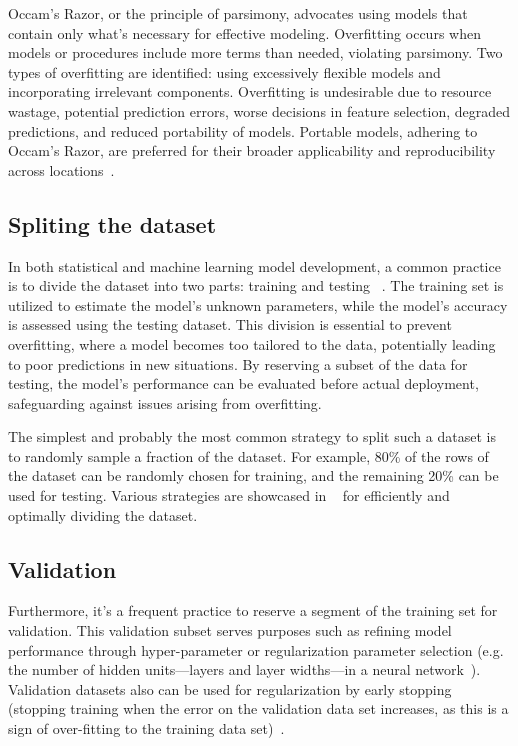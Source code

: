 Occam's Razor, or the principle of parsimony, advocates using models that contain only what's necessary for effective modeling. Overfitting occurs when models or procedures include more terms than needed, violating parsimony. Two types of overfitting are identified: using excessively flexible models and incorporating irrelevant components. Overfitting is undesirable due to resource wastage, potential prediction errors, worse decisions in feature selection, degraded predictions, and reduced portability of models. Portable models, adhering to Occam's Razor, are preferred for their broader applicability and reproducibility across locations~\cite{hawkins2004of,cook2016overfitting}.


\subsection{Spliting the dataset}

In both statistical and machine learning model development, a common practice is to divide the dataset into two parts: training and testing ~\cite{hastie2009elements}. The training set is utilized to estimate the model's unknown parameters, while the model's accuracy is assessed using the testing dataset. This division is essential to prevent overfitting, where a model becomes too tailored to the data, potentially leading to poor predictions in new situations. By reserving a subset of the data for testing, the model's performance can be evaluated before actual deployment, safeguarding against issues arising from overfitting.

The simplest and probably the most common strategy to split such a dataset is to randomly sample a fraction of the dataset. For example, 80\% of the rows of the dataset can be randomly chosen for training, and the remaining 20\% can be used for testing. Various strategies are showcased in ~\cite{roshan2022split} for efficiently and optimally dividing the dataset.

\subsection{Validation}
Furthermore, it's a frequent practice to reserve a segment of the training set for validation. This validation subset serves purposes such as refining model performance through hyper-parameter or regularization parameter selection (e.g. the number of hidden units—layers and layer widths—in a neural network~\cite{ripley2007pattern}). Validation datasets also can be used for regularization by early stopping (stopping training when the error on the validation data set increases, as this is a sign of over-fitting to the training data set)~\cite{Prechelt2012}.

